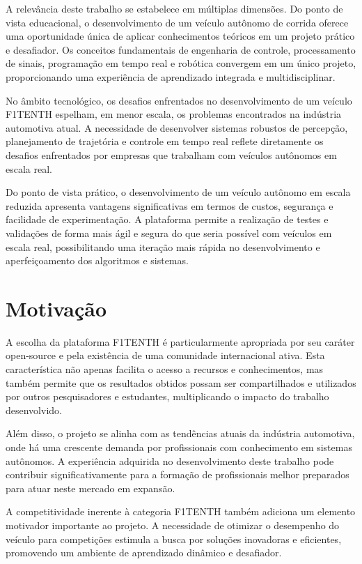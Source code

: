 A relevância deste trabalho se estabelece em múltiplas dimensões. Do ponto de
vista educacional, o desenvolvimento de um veículo autônomo de corrida oferece
uma oportunidade única de aplicar conhecimentos teóricos em um projeto prático
e desafiador. Os conceitos fundamentais de engenharia de controle,
processamento de sinais, programação em tempo real e robótica convergem em um
único projeto, proporcionando uma experiência de aprendizado integrada e
multidisciplinar.

No âmbito tecnológico, os desafios enfrentados no desenvolvimento de um veículo
F1TENTH espelham, em menor escala, os problemas encontrados na indústria
automotiva atual. A necessidade de desenvolver sistemas robustos de percepção,
planejamento de trajetória e controle em tempo real reflete diretamente os
desafios enfrentados por empresas que trabalham com veículos autônomos em
escala real.

Do ponto de vista prático, o desenvolvimento de um veículo autônomo em escala
reduzida apresenta vantagens significativas em termos de custos, segurança e
facilidade de experimentação. A plataforma permite a realização de testes e
validações de forma mais ágil e segura do que seria possível com veículos em
escala real, possibilitando uma iteração mais rápida no desenvolvimento e
aperfeiçoamento dos algoritmos e sistemas.

\section*{Motivação}\label{sec:motivacao}

A escolha da plataforma F1TENTH é particularmente apropriada por seu caráter
open-source e pela existência de uma comunidade internacional ativa. Esta
característica não apenas facilita o acesso a recursos e conhecimentos, mas
também permite que os resultados obtidos possam ser compartilhados e utilizados
por outros pesquisadores e estudantes, multiplicando o impacto do trabalho
desenvolvido.

Além disso, o projeto se alinha com as tendências atuais da indústria
automotiva, onde há uma crescente demanda por profissionais com conhecimento em
sistemas autônomos. A experiência adquirida no desenvolvimento deste trabalho
pode contribuir significativamente para a formação de profissionais melhor
preparados para atuar neste mercado em expansão.

A competitividade inerente à categoria F1TENTH também adiciona um elemento
motivador importante ao projeto. A necessidade de otimizar o desempenho do
veículo para competições estimula a busca por soluções inovadoras e eficientes,
promovendo um ambiente de aprendizado dinâmico e desafiador.

